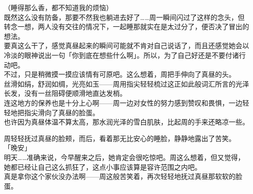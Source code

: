 （睡得那么香，都不知道我的烦恼）\\

既然这么没有防备，那要不然我也躺进去好了……周一瞬间闪过了这样的念头，但转念一想，两人没有交往的情况下，一起睡那就实在是太过分了，便否决了冒出的想法。\\

要真这么干了，感觉真昼起来的瞬间可能就不肯对自己说话了，而且还感觉她会以冷淡的眼神说出一句「你到底在想些什么啊」。所以，为了自己好还是不要付诸行动吧。\\

不过，只是稍微摸一摸应该情有可原吧。这么想着，周把手伸向了真昼的头。\\

丝滑如绢，舒润如绸，光亮如玉——周用指尖轻轻梳过这正如此般词汇所言的光泽长发，没有一丝阻碍便顺滑地直达发梢。\\

连这地方的保养也是十分上心啊——周一边对女性的努力感到赞叹和畏惧，一边轻轻地把指尖滑向了真昼的脸蛋。\\

也许因为真昼体温不算太高，那水润光泽的雪白肌肤，比起周的手来还略凉一些。

周轻轻抚过真昼的脸颊，而后，看着那无比安心的睡脸，静静地露出了苦笑。\\

「晚安」\\

明天……准确来说，今早醒来之后，她肯定会很吃惊吧。周这么想着，但又觉得，她都已经让自己这么抓狂了，这点小事应该算是容许范围之内吧。\\

真是拿你这个家伙没办法啊——周这般苦笑着，再次轻轻地抚过真昼那软软的脸蛋。
